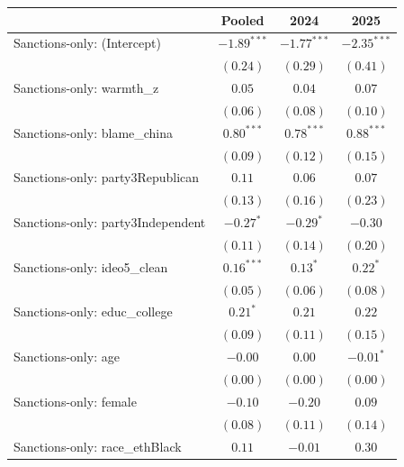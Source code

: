 
\begin{tabular}{l c c c}
\hline
 & Pooled & 2024 & 2025 \\
\hline
Sanctions-only: (Intercept)            & $-1.89^{***}$ & $-1.77^{***}$ & $-2.35^{***}$ \\
                                       & $(0.24)$      & $(0.29)$      & $(0.41)$      \\
Sanctions-only: warmth\_z              & $0.05$        & $0.04$        & $0.07$        \\
                                       & $(0.06)$      & $(0.08)$      & $(0.10)$      \\
Sanctions-only: blame\_china           & $0.80^{***}$  & $0.78^{***}$  & $0.88^{***}$  \\
                                       & $(0.09)$      & $(0.12)$      & $(0.15)$      \\
Sanctions-only: party3Republican       & $0.11$        & $0.06$        & $0.07$        \\
                                       & $(0.13)$      & $(0.16)$      & $(0.23)$      \\
Sanctions-only: party3Independent      & $-0.27^{*}$   & $-0.29^{*}$   & $-0.30$       \\
                                       & $(0.11)$      & $(0.14)$      & $(0.20)$      \\
Sanctions-only: ideo5\_clean           & $0.16^{***}$  & $0.13^{*}$    & $0.22^{*}$    \\
                                       & $(0.05)$      & $(0.06)$      & $(0.08)$      \\
Sanctions-only: educ\_college          & $0.21^{*}$    & $0.21$        & $0.22$        \\
                                       & $(0.09)$      & $(0.11)$      & $(0.15)$      \\
Sanctions-only: age                    & $-0.00$       & $0.00$        & $-0.01^{*}$   \\
                                       & $(0.00)$      & $(0.00)$      & $(0.00)$      \\
Sanctions-only: female                 & $-0.10$       & $-0.20$       & $0.09$        \\
                                       & $(0.08)$      & $(0.11)$      & $(0.14)$      \\
Sanctions-only: race\_ethBlack         & $0.11$        & $-0.01$       & $0.30$        \\

\end{tabular}
